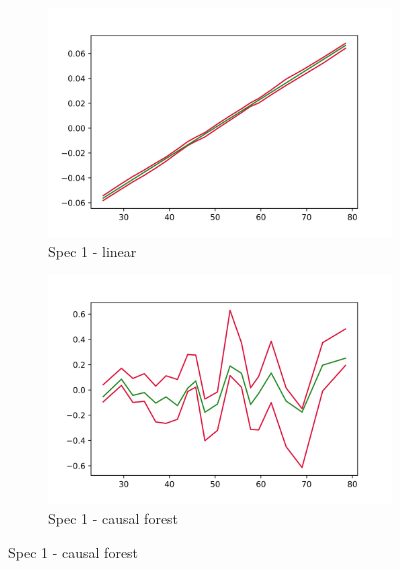 \begin{figure}[h]
    \centering
    \begin{subfigure}{0.5\linewidth}
        \includegraphics[width=\linewidth]{figures/ALE/chFDexp/spec1_linear_AGE.png}
        \caption{Spec 1 - linear}
    \end{subfigure}%
    \begin{subfigure}{0.5\linewidth}
        \includegraphics[width=\linewidth]{figures/ALE/chFDexp/spec1_cf_AGE.png}
        \caption{Spec 1 - causal forest}
    \end{subfigure}


\end{figure}
